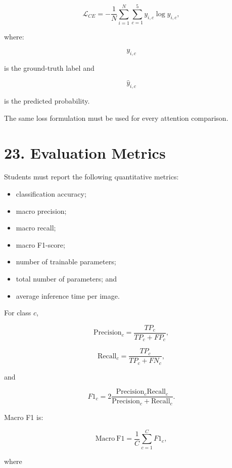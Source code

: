 \documentclass[10pt]{article}
\begin{document}
\[
\mathcal{L}_{CE}
=
-
\frac{1}{N}
\sum_{i=1}^{N}
\sum_{c=1}^{5}
y_{i,c}
\log
\widehat{y}_{i,c},
\]

where:

\[
y_{i,c}
\]

is the ground-truth label and

\[
\widehat{y}_{i,c}
\]

is the predicted probability.

The same loss formulation must be used for every attention comparison.

\section*{23. Evaluation Metrics}

Students must report the following quantitative metrics:

\begin{itemize}

\item classification accuracy;

\item macro precision;

\item macro recall;

\item macro F1-score;

\item number of trainable parameters;

\item total number of parameters; and

\item average inference time per image.

\end{itemize}

For class $c$,

\[
\mathrm{Precision}_c
=
\frac{TP_c}
{TP_c+FP_c},
\]

\[
\mathrm{Recall}_c
=
\frac{TP_c}
{TP_c+FN_c},
\]

and

\[
F1_c
=
2
\frac{
\mathrm{Precision}_c
\mathrm{Recall}_c
}{
\mathrm{Precision}_c+
\mathrm{Recall}_c
}.
\]

Macro F1 is:

\[
\mathrm{Macro\ F1}
=
\frac{1}{C}
\sum_{c=1}^{C}
F1_c,
\]

where
\end{document}
